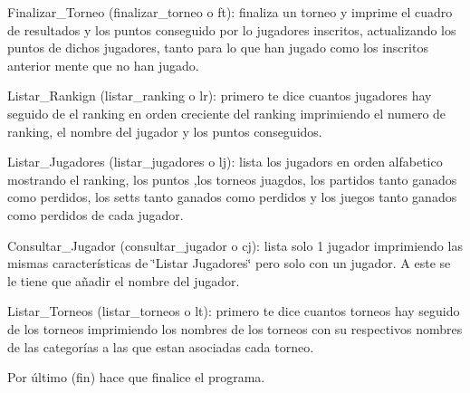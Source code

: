 \begin{DoxyItemize}
\begin{DoxyItemize}
\item Finalizar\+\_\+\+Torneo (finalizar\+\_\+torneo o ft)\+: finaliza un torneo y imprime el cuadro de resultados y los puntos conseguido por lo jugadores inscritos, actualizando los puntos de dichos jugadores, tanto para lo que han jugado como los inscritos anterior mente que no han jugado.
\item Listar\+\_\+\+Rankign (listar\+\_\+ranking o lr)\+: primero te dice cuantos jugadores hay seguido de el ranking en orden creciente del ranking imprimiendo el numero de ranking, el nombre del jugador y los puntos conseguidos.
\item Listar\+\_\+\+Jugadores (listar\+\_\+jugadores o lj)\+: lista los jugadors en orden alfabetico mostrando el ranking, los puntos ,los torneos juagdos, los partidos tanto ganados como perdidos, los setts tanto ganados como perdidos y los juegos tanto ganados como perdidos de cada jugador.
\item Consultar\+\_\+\+Jugador (consultar\+\_\+jugador o cj)\+: lista solo 1 jugador imprimiendo las mismas características de \char`\"{}\+Listar Jugadores\char`\"{} pero solo con un jugador. A este se le tiene que añadir el nombre del jugador.
\item Listar\+\_\+\+Torneos (listar\+\_\+torneos o lt)\+: primero te dice cuantos torneos hay seguido de los torneos imprimiendo los nombres de los torneos con su respectivos nombres de las categorías a las que estan asociadas cada torneo.
\item Por último (fin) hace que finalice el programa. 
\end{DoxyItemize}
\end{DoxyItemize}